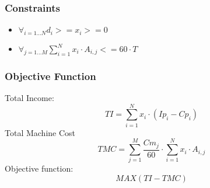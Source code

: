 \documentclass[11pt]{article}
\begin{document}
\subsubsection*{Constraints}
\begin{itemize}
    \item $\forall_{i=1 \hdots N} d_i >= x_i >= 0$
    \item $\forall_{j=1 \hdots M} \sum_{i=1}^{N} x_i \cdot A_{i, j}  <= 60 \cdot T$
\end{itemize}
\subsubsection*{Objective Function}
Total Income: $$ TI = \sum_{i=1}^{N} x_i \cdot (Ip_i - Cp_i)$$ 
Total Machine Cost $$ TMC = \sum_{j=1}^{M} \frac{Cm_j}{60} \cdot \sum_{i = 1}^{N} x_i \cdot A_{i, j} $$
Objective function: $$ MAX (TI - TMC)$$
\end{document}
